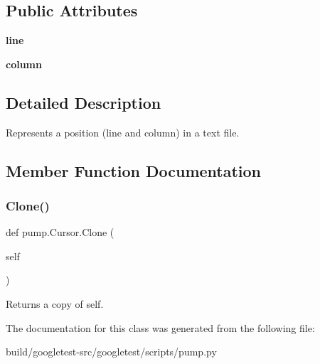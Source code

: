 \subsection*{Public Attributes}
\begin{DoxyCompactItemize}
\item 
\mbox{\label{classpump_1_1Cursor_aee8d8b67360da7fc4e635540cb41d48c}} 
{\bfseries line}
\item 
\mbox{\label{classpump_1_1Cursor_ae73db76c3a845a82afb334633864254e}} 
{\bfseries column}
\end{DoxyCompactItemize}


\subsection{Detailed Description}
\begin{DoxyVerb}Represents a position (line and column) in a text file.\end{DoxyVerb}
 

\subsection{Member Function Documentation}
\mbox{\label{classpump_1_1Cursor_af68c9be83b0af87db441b21bc6ce8114}} 
\subsubsection{\texorpdfstring{Clone()}{Clone()}}
{\footnotesize\ttfamily def pump.\+Cursor.\+Clone (\begin{DoxyParamCaption}\item[{}]{self }\end{DoxyParamCaption})}

\begin{DoxyVerb}Returns a copy of self.\end{DoxyVerb}
 

The documentation for this class was generated from the following file\+:\begin{DoxyCompactItemize}
\item 
build/googletest-\/src/googletest/scripts/pump.\+py\end{DoxyCompactItemize}
